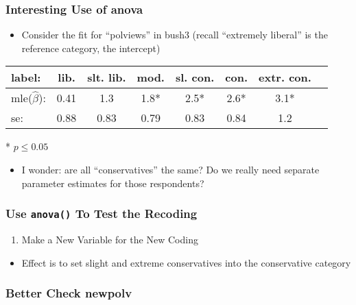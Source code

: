 \documentclass[10pt,english]{beamer}
\begin{document}
\begin{frame}
  \frametitle{Interesting Use of anova}
  \begin{itemize}
    \item Consider the fit for ``polviews'' in bush3 (recall
      ``extremely liberal'' is the reference category, the intercept)
    \end{itemize}


\begin{tabular}{l|ccccccc}
\hline
label:& lib. & slt. lib. & mod. & sl. con. & con. & extr. con. \tabularnewline
\hline
mle($\hat{\beta}$): & 0.41 & 1.3  & 1.8* & 2.5* & 2.6* & 3.1*\tabularnewline
\hline
se: & 0.88 & 0.83 & 0.79 & 0.83 & 0.84 & 1.2\tabularnewline
\hline
\end{tabular}

* $p \leq 0.05$

\begin{itemize}
\item I wonder: are all ``conservatives'' the same? Do we really
  need separate parameter estimates for those respondents?
\end{itemize}

\end{frame}


\begin{frame}[containsverbatim]
  \frametitle{Use \texttt{anova()} To Test the Recoding}

  \begin{enumerate}
    \item Make a New Variable for the New Coding

\end{enumerate}

\begin{itemize}
  \item Effect is to set slight and extreme conservatives into the
    conservative category
  \end{itemize}

\end{frame}


\begin{frame}[containsverbatim]
  \frametitle{Better Check newpolv}




\end{frame}

\end{document}
